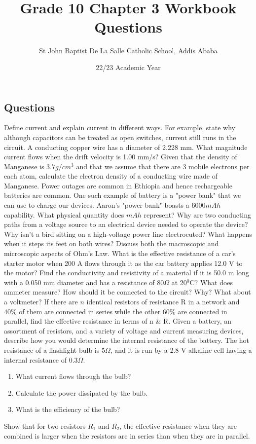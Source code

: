 \documentclass[12pt,addpoints]{exam}
\author{St John Baptist De La Salle Catholic School, Addis Ababa}
\date{22/23 Academic Year}
\begin{document}
	\title{Grade 10 Chapter 3 Workbook Questions}
	\maketitle
	
	\begin{center}
		\subsection*{Questions}
	\end{center}
	
	
	\begin{questions}
		\question Define current and explain current in different ways. For example, state why although capacitors can be treated as open switches, current still runs in the circuit.
		\question A conducting copper wire has a diameter of 2.228 mm. What magnitude current flows when the drift velocity is 1.00
		mm/s?
		\question Given that the density of Manganese is $3.7g/cm^3$ and that we assume that there are 3 mobile electrons per each atom, calculate the electron density of a conducting wire made of Manganese.
		\question Power outages are common in Ethiopia and hence rechargeable batteries are common. One such example of battery is a "power bank" that we can use to charge our devices. Aaron's "power bank" boasts a $6000mAh$ capability. What physical quantity does $mAh$ represent?
		\question Why are two conducting paths from a voltage source to an electrical device needed to operate the device?
		\question Why isn’t a bird sitting on a high-voltage power line electrocuted? What happens when it steps its feet on both wires?
		\question Discuss both the macroscopic and microscopic aspects of Ohm's Law.
		\question What is the effective resistance of a car’s starter motor when 200 A flows through it as the car battery applies 12.0 V to the motor?
		\question Find the conductivity and resistivity of a material if it is 50.0 m long with a 0.050 mm diameter and has a resistance of 80$\Omega$ at 20$^0$C?
		\question What does ammeter measure? How should it be connected to the circuit? Why? What about a voltmeter?
		\question If there are $n$ identical resistors of resistance R in a network and 40\% of them are connected in series while the other 60\% are connected in parallel, find the effective resistance in terms of n \& R. 
		\question Given a battery, an assortment of resistors, and a variety of voltage and current measuring devices, describe how you
		would determine the internal resistance of the battery.
		\question The hot resistance of a flashlight bulb is $5\Omega$, and it is run by a 2.8-V alkaline cell having a internal
		resistance of $0.3\Omega$.
		\begin{enumerate}[label=(\roman*)]
			\item What current flows through the bulb?
			\item Calculate the power dissipated by the bulb.
			\item What is the efficiency of the bulb?
		\end{enumerate}
		\question Show that for two resistors $R_1$ and $R_2$, the effective resistance when they are combined is larger when the resistors are in series than when they are in parallel.
	\end{questions}		
\end{document}
